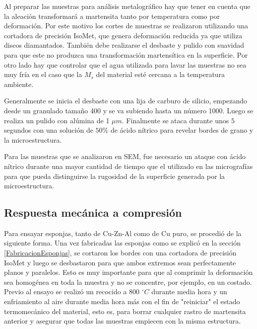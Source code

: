 \documentclass[a4paper,12pt,fleqn,twoside,openany]{book}
\begin{document}
Al preparar las muestras para análisis metalográfico hay que tener en cuenta que la aleación transformará a martensita tanto por temperatura como por deformación. Por este motivo los cortes de muestras se realizaron utilizando una cortadora de precisión IsoMet, que genera deformación reducida ya que utiliza discos diamantados. También debe realizarse el desbaste y pulido con suavidad para que este no produzca una transformación 
martensítica en la superficie. Por otro lado hay que controlar que el agua utilizada para lavar las muestras no sea muy fría en el caso 
que la $M_s$ del material esté cercana a la temperatura ambiente. 

Generalmente se inicia el desbaste con una lija de carburo de silicio, empezando desde un granulado tamaño 400 y se va subiendo hasta un número 1000. 
Luego se realiza un pulido con alúmina de 1 $\mu m$. Finalmente se ataca durante unos $5$ segundos con una solución de $50 \% $ de ácido nítrico para revelar bordes de grano y la microestructura. 

Para las muestras que se analizaron en SEM, fue necesario un ataque con ácido nítrico durante una mayor cantidad de tiempo que el utilizado en las micrografías para que pueda distinguirse la rugosidad de la superficie generada por la microestructura.

\subsection{Respuesta mecánica a compresión} \label{compresión}



Para ensayar esponjas, tanto de Cu-Zn-Al como de Cu puro, se procedió de la siguiente forma. Una vez fabricadas las esponjas como se explicó en la sección  \ref{FabricacionEsponjas}, se cortaron los bordes con una cortadora de precisión IsoMet y luego se desbastaron para que ambos extremos sean perfectamente planos y paralelos. Esto es muy importante para que al comprimir la deformación sea homogénea en toda la muestra y no se concentre, por ejemplo, en un costado. Previo al ensayo se realizó un recocido a 800 $^\circ C$ durante media hora y un enfriamiento al aire durante media hora más con el fin de "reiniciar" el estado termomecánico del material, esto es, para borrar cualquier rastro de martensita anterior y asegurar que todas las muestras empiecen con la misma estructura. 
\end{document}

